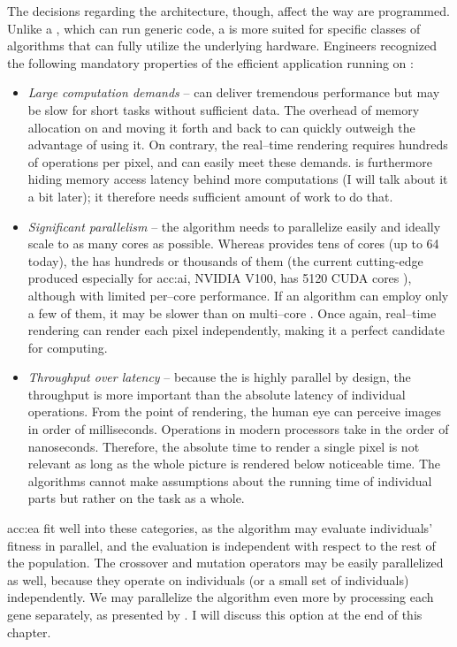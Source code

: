 The decisions regarding the architecture, though, affect the way  are programmed. Unlike a \cpuns, which can run generic code, a \gpu is more suited for specific classes of algorithms that can fully utilize the underlying hardware. Engineers recognized the following mandatory properties of the efficient application running on \gpu \citep{GPUComputingOwens}:
\begin{itemize}
    \item \textit{Large computation demands} -- \gpu can deliver tremendous performance but may be slow for short tasks without sufficient data. The overhead of memory allocation on \gpu and moving it forth and back to \cpu can quickly outweigh the advantage of using it. On contrary, the real--time rendering requires hundreds of operations per pixel, and \gpu can easily meet these demands. \gpu is furthermore hiding memory access latency behind more computations (I will talk about it a bit later); it therefore needs sufficient amount of work to do that.
    \item \textit{Significant parallelism} -- the algorithm needs to parallelize easily and ideally scale to as many cores as possible. Whereas \cpu provides tens of cores (up to 64 today), the \gpu has hundreds or thousands of them (the current cutting-edge \gpu produced especially for \acrshort{acc:ai}, NVIDIA V100, has 5120 CUDA cores \citep{nvidiav100spec}), although with limited per--core performance. If an algorithm can employ only a few of them, it may be slower than on multi--core \cpuns. Once again, real--time rendering can render each pixel independently, making it a perfect candidate for \gpu computing.
    \item \textit{Throughput over latency} -- because the \gpu is highly parallel by design, the throughput is more important than the absolute latency of individual operations. From the point of rendering, the human eye can perceive images in order of milliseconds. Operations in modern processors take in the order of nanoseconds. Therefore, the absolute time to render a single pixel is not relevant as long as the whole picture is rendered below noticeable time. The algorithms cannot make assumptions about the running time of individual parts but rather on the task as a whole.
\end{itemize}

\acrlong{acc:ea} fit well into these categories, as the algorithm may evaluate individuals' fitness in parallel, and the evaluation is independent with respect to the rest of the population. The crossover and mutation operators may be easily parallelized as well, because they operate on individuals (or a small set of individuals) independently. We may parallelize the algorithm even more by processing each gene separately, as presented by \citet{CHENG2019514}. I will discuss this option at the end of this chapter.




